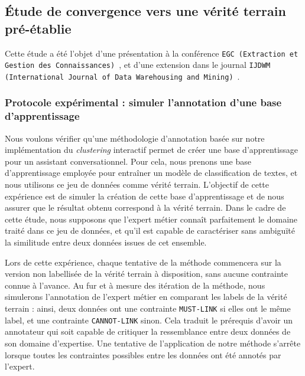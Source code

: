 		\subsection{Étude de convergence vers une vérité terrain pré-établie}
		\label{subsection:4.1.1-ETUDE-CONVERGENCE}
				
			Cette étude a été l'objet d'une présentation à la conférence \texttt{EGC (Extraction et Gestion des Connaissances)}~\citep{schild:conception-interactive-clustering:2021}, et d'une extension dans le journal \texttt{IJDWM (International Journal of Data Warehousing and Mining)}~\citep{schild:extension-interactive-clustering:2022}.
	
			\subsubsection{Protocole expérimental : simuler l'annotation d'une base d'apprentissage}
			
				Nous voulons vérifier qu'une méthodologie d'annotation basée sur notre implémentation du \textit{clustering} interactif permet de créer une base d'apprentissage pour un assistant conversationnel.
				Pour cela, nous prenons une base d'apprentissage employée pour entraîner un modèle de classification de textes, et nous utilisons ce jeu de données comme vérité terrain.
				L'objectif de cette expérience est de simuler la création de cette base d'apprentissage et de nous assurer que le résultat obtenu correspond à la vérité terrain.
				Dans le cadre de cette étude, nous supposons que l'expert métier connaît parfaitement le domaine traité dans ce jeu de données, et qu'il est capable de caractériser sans ambiguïté la similitude entre deux données issues de cet ensemble.
				
				Lors de cette expérience, chaque tentative de la méthode commencera sur la version non labellisée de la vérité terrain à disposition, sans aucune contrainte connue à l'avance.
				Au fur et à mesure des itération de la méthode, nous simulerons l'annotation de l'expert métier en comparant les labels de la vérité terrain : ainsi, deux données ont une contrainte \texttt{MUST-LINK} si elles ont le même label, et une contrainte \texttt{CANNOT-LINK} sinon. Cela traduit le prérequis d'avoir un annotateur qui soit capable de critiquer la ressemblance entre deux données de son domaine d'expertise.
				Une tentative de l'application de notre méthode s'arrête lorsque toutes les contraintes possibles entre les données ont été annotés par l'expert.

